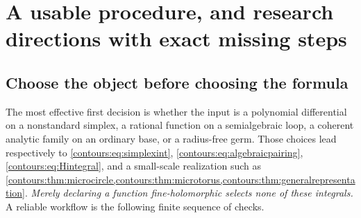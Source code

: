 \documentclass[11pt,letterpaper]{article}
\theoremstyle{definition}
\theoremstyle{remark}
\numberwithin{equation}{section}
\begin{document}
\section{A usable procedure, and research directions with exact missing steps}
\label{contours:sec:procedure}

\subsection{Choose the object before choosing the formula}
The most effective first decision is whether the input is a polynomial differential
on a nonstandard simplex, a rational function on a semialgebraic loop, a coherent
analytic family on an ordinary base, or a radius-free germ. Those choices lead
respectively to \eqref{contours:eq:simplexint},
\eqref{contours:eq:algebraicpairing}, \eqref{contours:eq:Hintegral}, and a
small-scale realization such as
\cref{contours:thm:microcircle,contours:thm:microtorus,contours:thm:generalrepresentation}. \emph{Merely declaring a function
fine-holomorphic selects none of these integrals.} A reliable workflow is the
following finite sequence of checks.
\end{document}

